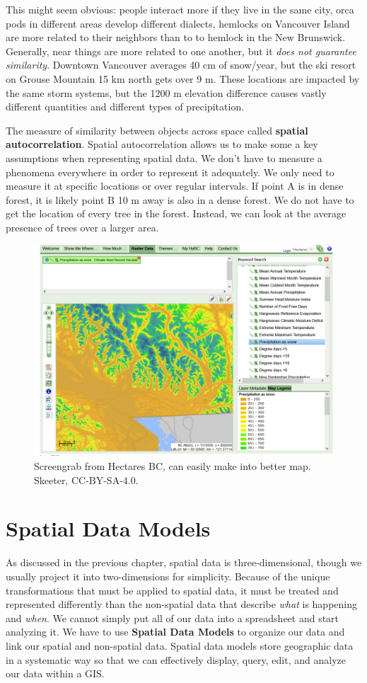 \documentclass[
]{book}
\begin{document}
This might seem obvious: people interact more if they live in the same city, orca pods in different areas develop different dialects, hemlocks on Vancouver Island are more related to their neighbors than to to hemlock in the New Brunswick. Generally, near things are more related to one another, but it \emph{does not guarantee similarity}. Downtown Vancouver averages 40 cm of snow/year, but the ski resort on Grouse Mountain 15 km north gets over 9 m. These locations are impacted by the same storm systems, but the 1200 m elevation difference causes vastly different quantities and different types of precipitation.

The measure of similarity between objects across space called \textbf{spatial autocorrelation}. Spatial autocorrelation allows us to make some a key assumptions when representing spatial data. We don't have to measure a phenomena everywhere in order to represent it adequately. We only need to measure it at specific locations or over regular intervals. If point A is in dense forest, it is likely point B 10 m away is also in a dense forest. We do not have to get the location of every tree in the forest. Instead, we can look at the average presence of trees over a larger area.

\begin{figure}
\includegraphics[width=0.75\linewidth]{images/03-bc-snow} \caption{Screengrab from Hectares BC, can easily make into better map. Skeeter, CC-BY-SA-4.0.}\label{fig:3-bc-snow}
\end{figure}

\hypertarget{spatial-data-models}{%
\section{Spatial Data Models}\label{spatial-data-models}}

As discussed in the previous chapter, spatial data is three-dimensional, though we usually project it into two-dimensions for simplicity. Because of the unique transformations that must be applied to spatial data, it must be treated and represented differently than the non-spatial data that describe \emph{what} is happening and \emph{when}. We cannot simply put all of our data into a spreadsheet and start analyzing it. We have to use \textbf{Spatial Data Models} to organize our data and link our spatial and non-spatial data. Spatial data models store geographic data in a systematic way so that we can effectively display, query, edit, and analyze our data within a GIS.
\end{document}
